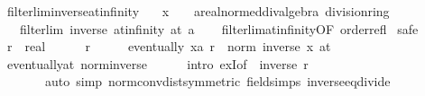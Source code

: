 \begin{isabellebody}
\ filterlim{\isacharunderscore}{\kern0pt}inverse{\isacharunderscore}{\kern0pt}at{\isacharunderscore}{\kern0pt}infinity{\isacharcolon}{\kern0pt}\isanewline
\ \ \ x\ {\isacharcolon}{\kern0pt}{\isacharcolon}{\kern0pt}\ {\isachardoublequoteopen}{\isacharunderscore}{\kern0pt}\ {\isasymRightarrow}\ {\isacharprime}{\kern0pt}a{\isacharcolon}{\kern0pt}{\isacharcolon}{\kern0pt}{\isacharbraceleft}{\kern0pt}real{\isacharunderscore}{\kern0pt}normed{\isacharunderscore}{\kern0pt}div{\isacharunderscore}{\kern0pt}algebra{\isacharcomma}{\kern0pt}\ division{\isacharunderscore}{\kern0pt}ring{\isacharbraceright}{\kern0pt}{\isachardoublequoteclose}\isanewline
\ \ \ {\isachardoublequoteopen}filterlim\ inverse\ at{\isacharunderscore}{\kern0pt}infinity\ {\isacharparenleft}{\kern0pt}at\ {\isacharparenleft}{\kern0pt}{}{\isacharcolon}{\kern0pt}{\isacharcolon}{\kern0pt}{\isacharprime}{\kern0pt}a{\isacharparenright}{\kern0pt}{\isacharparenright}{\kern0pt}{\isachardoublequoteclose}\isanewline
%
\isadelimproof
\ \ %
\endisadelimproof
%
\isatagproof
{}\isamarkupfalse%
\ filterlim{\isacharunderscore}{\kern0pt}at{\isacharunderscore}{\kern0pt}infinity{\isacharbrackleft}{\kern0pt}OF\ order{\isacharunderscore}{\kern0pt}refl{\isacharbrackright}{\kern0pt}\isanewline
{}\isamarkupfalse%
\ safe\isanewline
\ \ \isamarkupfalse%
\ r\ {\isacharcolon}{\kern0pt}{\isacharcolon}{\kern0pt}\ real\isanewline
\ \ \isamarkupfalse%
\ {\isachardoublequoteopen}{}\ {\isacharless}{\kern0pt}\ r{\isachardoublequoteclose}\isanewline
\ \ \isamarkupfalse%
\ \isamarkupfalse%
\ {\isachardoublequoteopen}eventually\ {\isacharparenleft}{\kern0pt}{\isasymlambda}x{\isacharcolon}{\kern0pt}{\isacharcolon}{\kern0pt}{\isacharprime}{\kern0pt}a{\isachardot}{\kern0pt}\ r\ {\isasymle}\ norm\ {\isacharparenleft}{\kern0pt}inverse\ x{\isacharparenright}{\kern0pt}{\isacharparenright}{\kern0pt}\ {\isacharparenleft}{\kern0pt}at\ {}{\isacharparenright}{\kern0pt}{\isachardoublequoteclose}\isanewline
\ \ \ \ \isamarkupfalse%
\ eventually{\isacharunderscore}{\kern0pt}at\ norm{\isacharunderscore}{\kern0pt}inverse\isanewline
\ \ \ \ \isamarkupfalse%
\ {\isacharparenleft}{\kern0pt}intro\ exI{\isacharbrackleft}{\kern0pt}of\ {\isacharunderscore}{\kern0pt}\ {\isachardoublequoteopen}inverse\ r{\isachardoublequoteclose}{\isacharbrackright}{\kern0pt}{\isacharparenright}{\kern0pt}\isanewline
\ \ \ \ \ \ \ {\isacharparenleft}{\kern0pt}auto\ simp{\isacharcolon}{\kern0pt}\ norm{\isacharunderscore}{\kern0pt}conv{\isacharunderscore}{\kern0pt}dist{\isacharbrackleft}{\kern0pt}symmetric{\isacharbrackright}{\kern0pt}\ field{\isacharunderscore}{\kern0pt}simps\ inverse{\isacharunderscore}{\kern0pt}eq{\isacharunderscore}{\kern0pt}divide{\isacharparenright}{\kern0pt}\isanewline

\end{isabellebody}
